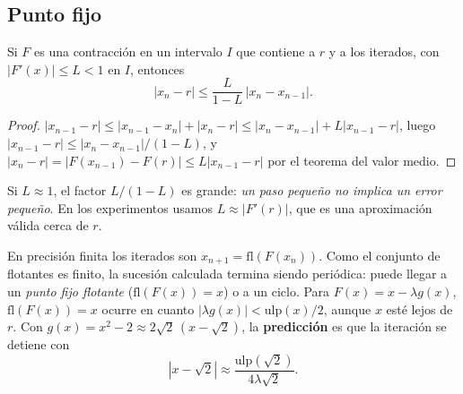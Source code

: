 \documentclass[11pt]{article}
\begin{document}
\subsection{Punto fijo}
Si $F$ es una contracción en un intervalo $I$ que contiene a $r$ y a los iterados, con $|F'(x)|\le L<1$ en $I$, entonces
\[
|x_n-r|\le \frac{L}{1-L}\,|x_n-x_{n-1}|.
\]
\begin{proof}
$|x_{n-1}-r|\le|x_{n-1}-x_n|+|x_n-r|\le|x_n-x_{n-1}|+L|x_{n-1}-r|$, luego $|x_{n-1}-r|\le|x_n-x_{n-1}|/(1-L)$, y $|x_n-r|=|F(x_{n-1})-F(r)|\le L|x_{n-1}-r|$ por el teorema del valor medio.
\end{proof}
Si $L\approx1$, el factor $L/(1-L)$ es grande: \emph{un paso pequeño no implica un error pequeño}. En los experimentos usamos $L\approx|F'(r)|$, que es una aproximación válida cerca de $r$.

En precisión finita los iterados son $x_{n+1}=\mathrm{fl}(F(x_n))$. Como el conjunto de flotantes es finito, la sucesión calculada termina siendo periódica: puede llegar a un \emph{punto fijo flotante} ($\mathrm{fl}(F(x))=x$) o a un ciclo. Para $F(x)=x-\lambda g(x)$, $\mathrm{fl}(F(x))=x$ ocurre en cuanto $|\lambda g(x)|<\mathrm{ulp}(x)/2$, aunque $x$ esté lejos de $r$. Con $g(x)=x^2-2\approx 2\sqrt2\,(x-\sqrt2)$, la \textbf{predicción} es que la iteración se detiene con
\[
|x-\sqrt2|\approx\frac{\mathrm{ulp}(\sqrt2)}{4\lambda\sqrt2}.
\]
\end{document}

